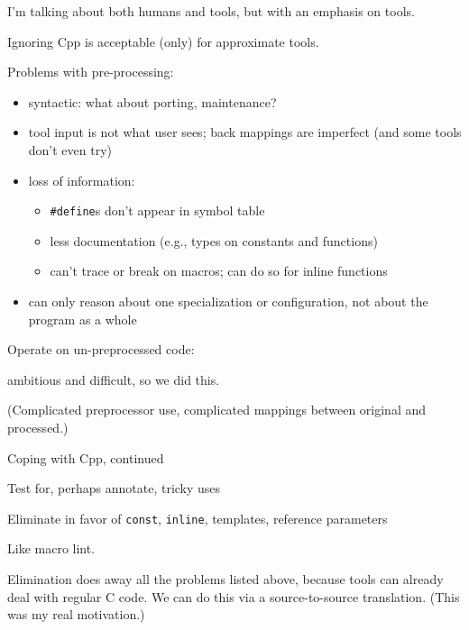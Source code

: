 \documentclass{slides}
\def\slidetitle#1{\begin{center}\large #1 \end{center}}
\def\slbreak{\\ \strut\hspace{1em}}
\begin{document}
\begin{note}
\vspace{-40pt} %
{\small
I'm talking about both humans and tools, but with an emphasis on tools.

Ignoring Cpp is acceptable (only) for approximate tools.

Problems with pre-processing:
\vspace{-.3in}
\begin{itemize}\itemsep 0pt \parskip 0pt
\item syntactic: what about porting, maintenance?
\item tool input is not what user sees; back mappings are imperfect (and
  some tools don't even try)
\item loss of information:
\begin{itemize}\itemsep 0pt \parskip 0pt
  \item {\tt \#define}s don't appear in symbol table
  \item less documentation (e.g., types on constants and functions)
  \item can't trace or break on macros; can do so for inline functions
\end{itemize}
\item can only reason about one specialization or configuration, not about
  the program as a whole
\end{itemize}

Operate on un-preprocessed code: \slbreak
ambitious and difficult, so we did this. \slbreak
(Complicated preprocessor use, complicated mappings between original and processed.)
}
\end{note}

\begin{slide}
\slidetitle{Coping with Cpp, continued}

Test for, perhaps annotate, tricky uses

Eliminate in favor of {\tt const}, {\tt inline}, templates, reference
parameters


\end{slide}

\begin{note}
Like macro lint.

Elimination does away all the problems listed above, because tools can
already deal with regular C code.  We can do this via a source-to-source
translation.  (This was my real motivation.)
\end{note}
\end{document}
